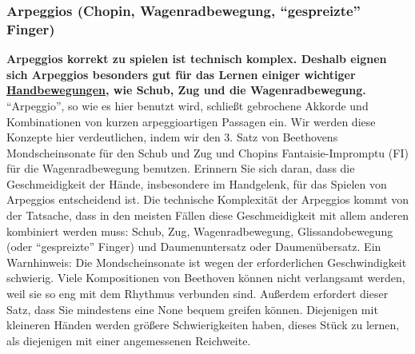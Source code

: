 
\label{c1iii5e}
\subsubsection{Arpeggios (Chopin, Wagenradbewegung, \enquote{gespreizte} Finger)}
\label{Arpeggios}

\textbf{Arpeggios korrekt zu spielen ist technisch komplex.
Deshalb eignen sich Arpeggios besonders gut für das Lernen einiger wichtiger \hyperref[c1iii4]{Handbewegungen}, wie Schub, Zug und die Wagenradbewegung.}
\enquote{Arpeggio}, so wie es hier benutzt wird, schließt gebrochene Akkorde und Kombinationen von kurzen arpeggioartigen Passagen ein.
Wir werden diese Konzepte hier verdeutlichen, indem wir den 3. Satz von Beethovens Mondscheinsonate für den Schub und Zug und Chopins Fantaisie-Impromptu (FI) für die Wagenradbewegung benutzen.
Erinnern Sie sich daran, dass die Geschmeidigkeit der Hände, insbesondere im Handgelenk, für das Spielen von Arpeggios entscheidend ist.
Die technische Komplexität der Arpeggios kommt von der Tatsache, dass in den meisten Fällen diese Geschmeidigkeit mit allem anderen kombiniert werden muss: Schub, Zug, Wagenradbewegung, Glissandobewegung (oder \enquote{gespreizte} Finger) und Daumenuntersatz oder Daumenübersatz.
Ein Warnhinweis: Die Mondscheinsonate ist wegen der erforderlichen Geschwindigkeit schwierig.
Viele Kompositionen von Beethoven können nicht verlangsamt werden, weil sie so eng mit dem Rhythmus verbunden sind.
Außerdem erfordert dieser Satz, dass Sie mindestens eine None bequem greifen können.
Diejenigen mit kleineren Händen werden größere Schwierigkeiten haben, dieses Stück zu lernen, als diejenigen mit einer angemessenen Reichweite.

